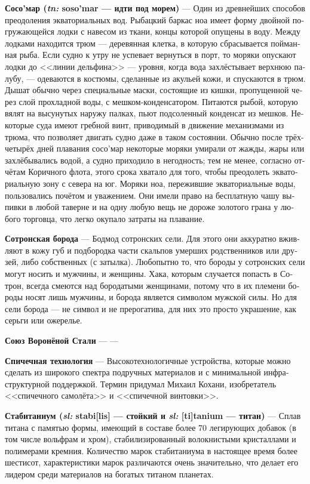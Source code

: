 \documentclass[a4paper,12pt,fleqn]{book}\usepackage{cooltooltips}\usepackage{polyglossia}\setdefaultlanguage[babelshorthands=true]{russian}\setotherlanguage{english}\defaultfontfeatures{Ligatures=TeX,Mapping=tex-text} \usepackage{xcolor}\definecolor{lightgray}{HTML}{bbbbbb}\color{lightgray}\newcommand{\ml}[3]{\textenglish{\textcolor{black}{#3}}}
\newcommand{\theterm}[3]{\textbf{\hypertarget{#1}{#2}} --- #3}
\newcommand{\theorigin}[3]{\textit{#1:} #2 --- #3}
\begin{document}
{\theterm{soso-mar}
{Сосо'мар (\theorigin{tn}{soso'mar}{идти под морем})}
{Один из древнейших способов преодоления экваториальных вод.
Рыбацкий баркас ноа имеет форму двойной погружающейся лодки с навесом из ткани, концы которой опущены в воду.
Между лодками находится трюм --- деревянная клетка, в которую сбрасывается пойманная рыба.
Если судно к утру не успевает вернуться в порт, то моряки опускают лодки до <<линии дельфина>> --- уровня, когда вода захлёстывает верхнюю палубу, --- одеваются в костюмы, сделанные из акульей кожи, и спускаются в трюм.
Дышат обычно через специальные маски, состоящие из кишки, пропущенной через слой прохладной воды, с мешком-конденсатором.
Питаются рыбой, которую вялят на высунутых наружу палках, пьют подсоленный конденсат из мешков.
Некоторые суда имеют гребной винт, приводимый в движение механизмами из трюма, что позволяет двигать судно даже в таком состоянии.
Обычно после трёх-четырёх дней плавания сосо'мар некоторые моряки умирали от жажды, жары или захлёбывались водой, а судно приходило в негодность;
тем не менее, согласно отчётам Коричного флота, этого срока хватало для того, чтобы преодолеть экваториальную зону с севера на юг.
Моряки ноа, пережившие экваториальные воды, пользовались почётом и уважением.
Они имели право на бесплатную чашу выпивки в любой таверне и на одну любую вещь не дороже золотого грана у любого торговца, что легко окупало затраты на плавание.}

\theterm{sotron-beard}
{Сотронская борода}
{Бодмод сотронских сели.
Для этого они аккуратно вживляют в кожу губ и подбородка части скальпов умерших родственников или друзей, либо собственных (с затылка).
Любопытно то, что бороды у сотронских сели могут носить и мужчины, и женщины.
Хака, которым случается попасть в Сотрон, всегда смеются над бородатыми женщинами, потому что в их племени бороды носят лишь мужчины, и борода является символом мужской силы.
Но для сели борода --- не символ и не прерогатива, для них это просто украшение, как серьги или ожерелье.}

\theterm{blued-steel-union} %
{Союз Воронёной Стали}
{---}

\theterm{match-tech}
{Спичечная технология}
{Высокотехнологичные устройства, которые можно сделать из широкого спектра подручных материалов и с минимальной инфраструктурной поддержкой.
Термин придумал Михаил Кохани, изобретатель <<спичечного самолёта>> и <<спичечной винтовки>>.}

\theterm{stabitanium}
{Стабитаниум (\theorigin{sl}{stabi[lis]}{стойкий} и \theorigin{sl}{[ti]tanium}{титан})}
{Сплав титана с памятью формы, имеющий в составе более 70 легирующих добавок (в том числе вольфрам и хром), стабилизированный волокнистыми кристаллами и полимерами кремния.
Количество марок стабитаниума в настоящее время более шестисот, характеристики марок различаются очень значительно, что делает его лидером среди материалов на богатых титаном планетах.}

}
\end{document}
